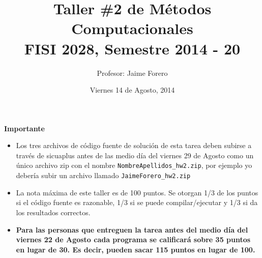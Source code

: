 \documentclass{article}
\title{Taller \#2 de M\'etodos Computacionales\\ FISI 2028, Semestre 2014 - 20}
\author{Profesor: Jaime Forero}
\date{Viernes 14 de Agosto, 2014}
\begin{document}
\maketitle
\thispagestyle{empty}


{\bf Importante}
\begin{itemize}

\item Los tres archivos de c\'odigo fuente de soluci\'on de esta tarea
  deben subirse a trav\'es de sicuaplus antes de las medio d\'ia del
  viernes 29 de Agosto como un \'unico archivo zip con el nombre
  \verb"NombreApellidos_hw2.zip", por ejemplo yo deber\'ia subir un
  archivo llamado \verb"JaimeForero_hw2.zip" 

\item La nota m\'axima de este taller es de 100 puntos. Se otorgan 1/3
  de los puntos si el c\'odigo fuente es razonable, 1/3 si se puede
  compilar/ejecutar y 1/3 si da los resultados correctos.  
\item 
{\bf Para las personas que entreguen la tarea antes del medio d\'ia
  del viernes 22 de Agosto cada programa se calificar\'a sobre 35
  puntos en lugar de 30. Es decir, pueden sacar 115 puntos en lugar de
  100.} 
\end{itemize}
\end{document}
